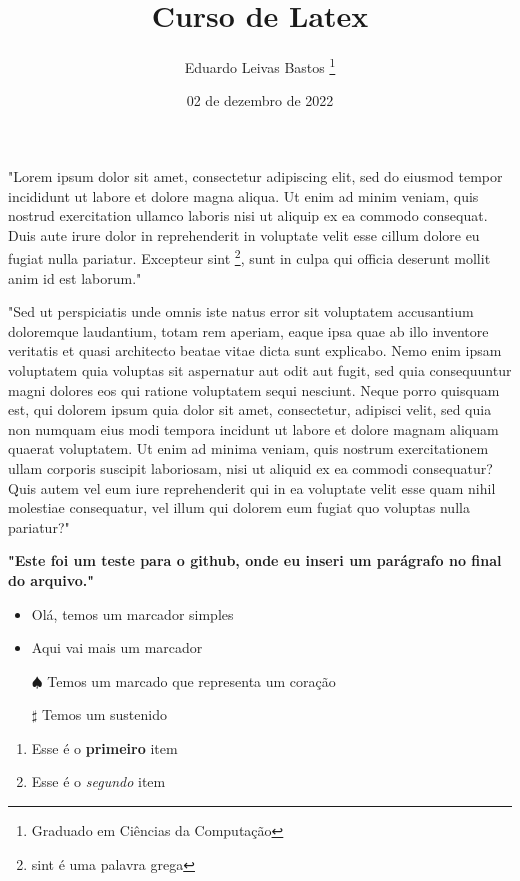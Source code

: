 \documentclass[12pt, a4paper]{article}
\begin{document}
\title{Curso de Latex}
\author{Eduardo Leivas Bastos \footnote{Graduado em Ciências da Computação}}
\date{02 de dezembro de 2022}
\maketitle
\onehalfspacing

"Lorem ipsum dolor sit amet, consectetur adipiscing elit, sed do eiusmod tempor incididunt ut labore et dolore magna aliqua. Ut enim ad minim veniam, quis nostrud exercitation ullamco laboris nisi ut aliquip ex ea commodo consequat. Duis aute irure dolor in reprehenderit in voluptate velit esse cillum dolore eu fugiat nulla pariatur. Excepteur sint \footnote {sint é uma palavra grega}, sunt in culpa qui officia deserunt mollit anim id est laborum."

"Sed ut perspiciatis unde omnis iste natus error sit voluptatem accusantium doloremque laudantium, totam rem aperiam, eaque ipsa quae ab illo inventore veritatis et quasi architecto beatae vitae dicta sunt explicabo. Nemo enim ipsam voluptatem quia voluptas sit aspernatur aut odit aut fugit, sed quia consequuntur magni dolores eos qui ratione voluptatem sequi nesciunt. Neque porro quisquam est, qui dolorem ipsum quia dolor sit amet, consectetur, adipisci velit, sed quia non numquam eius modi tempora incidunt ut labore et dolore magnam aliquam quaerat voluptatem. Ut enim ad minima veniam, quis nostrum exercitationem ullam corporis suscipit laboriosam, nisi ut aliquid ex ea commodi consequatur? Quis autem vel eum iure reprehenderit qui in ea voluptate velit esse quam nihil molestiae consequatur, vel illum qui dolorem eum fugiat quo voluptas nulla pariatur?"

\textbf{"Este foi um teste para o github, onde eu inseri um parágrafo no final do arquivo."}

\begin{itemize}
	\item Olá, temos um marcador simples
	\item Aqui vai mais um marcador
\end{itemize}

\begin{itemize}
	\item[$\spadesuit$] Temos um marcado que representa um coração
	\item[$\sharp$] Temos um sustenido
\end{itemize}

\begin{enumerate}
	\item Esse é o \textbf{primeiro} item
	\item Esse é o \textit{segundo} item
\end{enumerate}
\end{document}
